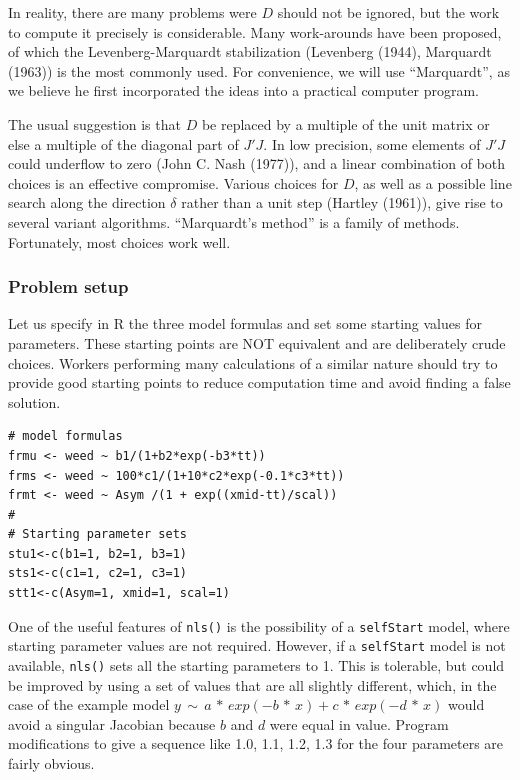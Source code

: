 In reality, there are many problems were \(D\) should not be ignored, but the work
to compute it precisely is considerable. Many work-arounds have been
proposed, of which the Levenberg-Marquardt stabilization
(Levenberg (1944), Marquardt (1963)) is
the most commonly used. For convenience, we will use ``Marquardt'', as we believe he
first incorporated the ideas into a practical computer program.

The usual suggestion is that \(D\) be replaced by a multiple of the unit matrix or else
a multiple of the diagonal part of \(J' J\). In low precision, some elements of
\(J' J\) could underflow to zero (John C. Nash (1977)), and a linear combination of both
choices is an effective compromise. Various choices for
\(D\), as well as a possible line search along the
direction \(\delta\) rather than a unit step (Hartley (1961)),
give rise to several variant
algorithms. ``Marquardt's method'' is a family of methods. Fortunately, most choices
work well.

\subsubsection{Problem setup}\label{problem-setup}

Let us specify in R the three model formulas and set some starting
values for parameters. These starting points are NOT equivalent and
are deliberately crude choices. Workers performing many calculations
of a similar nature should try to provide good starting points to reduce
computation time and avoid finding a false solution.

\begin{verbatim}
# model formulas
frmu <- weed ~ b1/(1+b2*exp(-b3*tt))
frms <- weed ~ 100*c1/(1+10*c2*exp(-0.1*c3*tt))
frmt <- weed ~ Asym /(1 + exp((xmid-tt)/scal))
#
# Starting parameter sets
stu1<-c(b1=1, b2=1, b3=1)
sts1<-c(c1=1, c2=1, c3=1)
stt1<-c(Asym=1, xmid=1, scal=1)
\end{verbatim}

One of the useful features of \texttt{nls()} is the possibility of a \texttt{selfStart} model,
where starting parameter values are not required. However, if a \texttt{selfStart} model
is not available, \texttt{nls()} sets all the starting parameters
to 1. This is tolerable, but could be improved by using a set of values
that are all slightly different, which, in the case of the example
model \(y \,\sim\, a \,*\, exp(-b \,*\, x) + c\,*\,exp(-d \,*\, x)\)
would avoid a singular Jacobian because \(b\) and \(d\) were equal in value.
Program modifications to give a sequence like 1.0, 1.1, 1.2, 1.3 for the four
parameters are fairly obvious.

